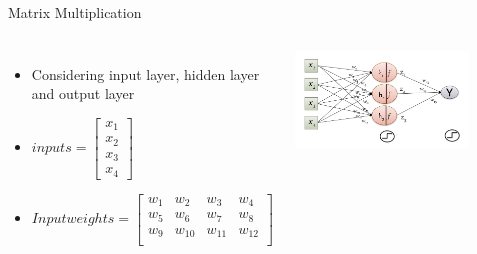 \documentclass[aspectratio=169,13pt,usenames,dvipsnames]{beamer}
\begin{document}
\begin{frame}{Matrix Multiplication}
\begin{columns}
\begin{itemize}
  \item Considering input layer, hidden layer and output layer
  \item {$inputs = \begin{bmatrix} x_1 \\ x_2 \\ x_3 \\ x_4 \end{bmatrix} $}
  \item {$Input weights = \begin{bmatrix}w_{1} & w_{2} & w_{3} & w_{4} \\ w_{5} & w_{6} & w_{7} & w_{8} \\ w_{9} & w_{10} & w_{11} & w_{12} \\
                          \end{bmatrix}$}
  
\end{itemize}
\includegraphics[width=0.8\textwidth, height=0.6\textheight]{Images/AIML_MLP_IMG4.jpg}
\end{columns}
\end{frame}
\end{document}
